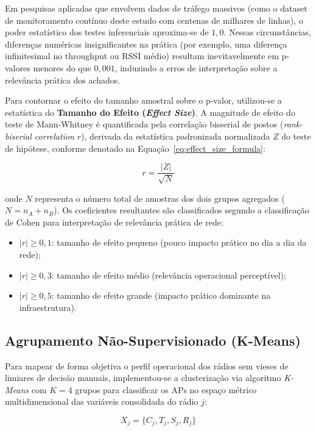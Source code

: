 Em pesquisas aplicadas que envolvem dados de tráfego massivos (como o dataset de monitoramento contínuo deste estudo com centenas de milhares de linhas), o poder estatístico dos testes inferenciais aproxima-se de $1,0$. Nessas circunstâncias, diferenças numéricas insignificantes na prática (por exemplo, uma diferença infinitesimal no throughput ou RSSI médio) resultam inevitavelmente em p-valores menores do que $0,001$, induzindo a erros de interpretação sobre a relevância prática dos achados. 

Para contornar o efeito do tamanho amostral sobre o p-valor, utilizou-se a estatística do \textbf{Tamanho do Efeito (\textit{Effect Size})}. A magnitude de efeito do teste de Mann-Whitney é quantificada pela correlação bisserial de postos (\textit{rank-biserial correlation} $r$), derivada da estatística padronizada normalizada $Z$ do teste de hipótese, conforme denotado na Equação~\ref{eq:effect_size_formula}:

\begin{equation}
\label{eq:effect_size_formula}
r = \frac{|Z|}{\sqrt{N}}
\end{equation}

onde $N$ representa o número total de amostras dos dois grupos agregados ($N = n_A + n_B$). Os coeficientes resultantes são classificados segundo a classificação de Cohen para interpretação de relevância prática de rede:
\begin{itemize}
    \item $|r| \ge 0,1$: tamanho de efeito pequeno (pouco impacto prático no dia a dia da rede);
    \item $|r| \ge 0,3$: tamanho de efeito médio (relevância operacional perceptível);
    \item $|r| \ge 0,5$: tamanho de efeito grande (impacto prático dominante na infraestrutura).
\end{itemize}

\subsection{Agrupamento Não-Supervisionado (K-Means)}
\label{subsec:metodologia_kmeans_teoria}

Para mapear de forma objetiva o perfil operacional dos rádios sem vieses de limiares de decisão manuais, implementou-se a clusterização via algoritmo \textit{K-Means} com $K=4$ grupos para classificar os APs no espaço métrico multidimensional das variáveis consolidada do rádio $j$:

\begin{equation}
\label{eq:features_kmeans_metodologia}
X_j = \{ C_j, T_j, S_j, R_j \}
\end{equation}

